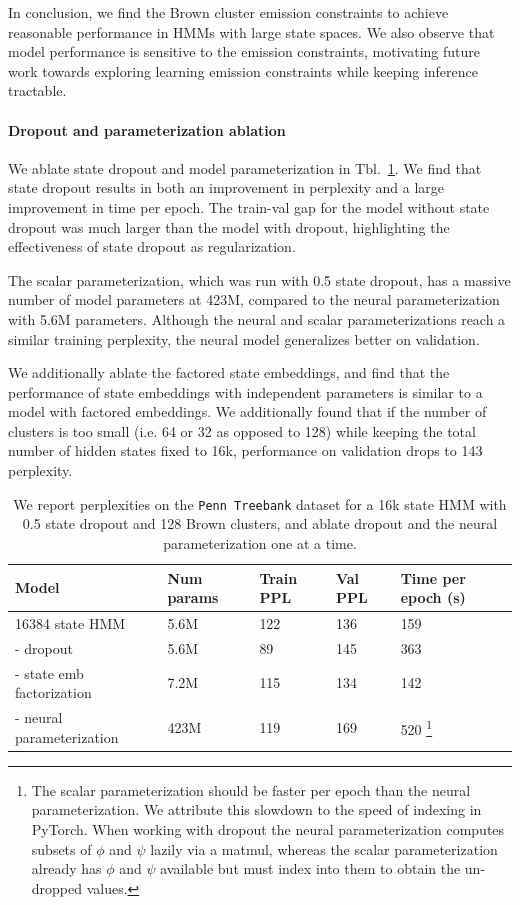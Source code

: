\documentclass[11pt,a4paper]{article}
\begin{document}
In conclusion,
we find the Brown cluster emission constraints to achieve reasonable performance
in HMMs with large state spaces.
We also observe that model performance is sensitive to the emission constraints,
motivating future work towards exploring learning emission constraints
while keeping inference tractable. 


\paragraph{Dropout and parameterization ablation}
We ablate state dropout and model parameterization in Tbl.~\ref{tbl:dropout-param-ablation}.
We find that state dropout results in both an improvement in perplexity
and a large improvement in time per epoch.
The train-val gap for the model without state dropout was much larger than 
the model with dropout, highlighting the effectiveness of state dropout as regularization.

The scalar parameterization, which was run with 0.5 state dropout,
has a massive number of model parameters at 423M, compared to the
neural parameterization with 5.6M parameters.
Although the neural and scalar parameterizations reach a similar training perplexity,
the neural model generalizes better on validation.

We additionally ablate the factored state embeddings,
and find that the performance of state embeddings with
independent parameters is similar to a model with factored embeddings.
We additionally found that if the number of clusters is too small
(i.e. 64 or 32 as opposed to 128)
while keeping the total number of hidden states fixed to 16k,
performance on validation drops to 143 perplexity.

\begin{table}[!t]
\centering
\begin{tabular}{lllll}
\toprule
Model                           & Num params & Train PPL & Val PPL & Time per epoch (s)\\
\midrule
16384 state HMM                 & 5.6M       & 122    & 136  & 159\\
\quad - dropout                 & 5.6M       & 89     & 145  & 363\\
\quad - state emb factorization & 7.2M       & 115    & 134  & 142\\
\quad - neural parameterization & 423M       & 119    & 169 & 520
\footnote{The scalar parameterization should be faster per epoch than the
neural parameterization. We attribute this slowdown
to the speed of indexing in PyTorch.
When working with dropout
the neural parameterization computes subsets
of $\phi$ and $\psi$ lazily via a matmul,
whereas the scalar parameterization already has $\phi$ and $\psi$
available but must index into them to obtain the
un-dropped values.}\\
\bottomrule
\end{tabular}
\caption{\label{tbl:dropout-param-ablation}
We report perplexities on the \texttt{Penn Treebank} dataset
for a 16k state HMM with 0.5 state dropout and 128 Brown clusters, and ablate
dropout and the neural parameterization one at a time.
}
\end{table}
\end{document}
